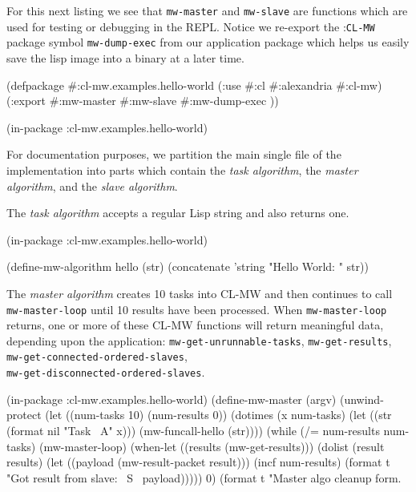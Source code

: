 \documentclass[titlepage,12pt]{book}
\newcommand{\xsmall}{\latexhtml{\small}{}}
\newcommand{\xnormalsize}{\latexhtml{\normalsize}{}}
\newcommand{\clmw}{\xsmall\textsc{CL-MW}\xnormalsize\xspace}
\newcommand{\package}[1]{\mbox{:\uppercase{\xsmall\texttt{#1}\xnormalsize}} package\xspace}
\newcommand{\mwpackage}{\package{CL-MW}}
\newcommand{\sa}{\textit{slave algorithm}\xspace}
\newcommand{\ma}{\textit{master algorithm}\xspace}
\newcommand{\ta}{\textit{task algorithm}\xspace}
\newcommand{\func}[1]{\mbox{\texttt{#1}}\xspace}
\newcommand{\file}[1]{\texttt{#1}\xspace}
\newcommand{\bold}[1]{\textbf{#1}\xspace}
\begin{document}
For this next listing we see that \func{mw-master} and \func{mw-slave}
are functions which are used for testing or debugging in the
REPL. Notice we re-export the \mwpackage symbol \func{mw-dump-exec}
from our application package which helps us easily save the lisp image
into a binary at a later time.

\begin{lisp}[caption=\file{package.lisp}]
(defpackage #:cl-mw.examples.hello-world
  (:use #:cl #:alexandria #:cl-mw)
  (:export #:mw-master
           #:mw-slave
           #:mw-dump-exec ))

(in-package :cl-mw.examples.hello-world)
\end{lisp}

For documentation purposes, we partition the main single file of the
implementation into parts which contain the \ta, the \ma, and the \sa.

The \ta accepts a regular Lisp string and also returns one.

\begin{lisp}[caption=\file{hello-world.lisp: \bold{Part 1 of 4}}]
(in-package :cl-mw.examples.hello-world)

(define-mw-algorithm hello (str)
  (concatenate 'string "Hello World: " str))
\end{lisp}

The \ma creates 10 tasks into \clmw and then continues
to call \func{mw-master-loop} until 10 results have been
processed.  When \func{mw-master-loop} returns, one or
more of these \clmw functions will return meaningful data,
depending upon the application: \func{mw-get-unrunnable-tasks},
\func{mw-get-results}, \func{mw-get-connected-ordered-slaves},\\
\func{mw-get-disconnected-ordered-slaves}.

\begin{lisp}[caption=\file{hello-world.lisp: \bold{Part 2 of 4}}]
(in-package :cl-mw.examples.hello-world)
(define-mw-master (argv)
    (unwind-protect
         (let ((num-tasks 10)
               (num-results 0))
           (dotimes (x num-tasks)
             (let ((str (format nil "Task ~A" x)))
               (mw-funcall-hello (str))))
           (while (/= num-results num-tasks)
             (mw-master-loop)
             (when-let ((results (mw-get-results)))
               (dolist (result results)
                 (let ((payload (mw-result-packet result)))
                   (incf num-results)
                   (format t "Got result from slave: ~S~%
                           payload)))))
           0)
      (format t "Master algo cleanup form.~%
\end{lisp}
\end{document}
